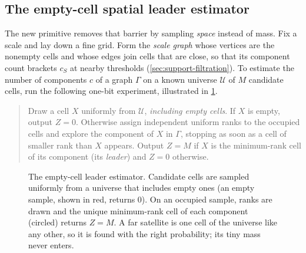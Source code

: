 \subsection{The empty-cell spatial leader estimator}\label{sec:ov-leader}

The new primitive removes that barrier by sampling \emph{space} instead of mass. Fix a scale and lay
down a fine grid. Form the \emph{scale graph} whose vertices are the nonempty cells and whose edges join
cells that are close, so that its component count brackets $c_S$ at nearby thresholds
(\cref{sec:support-filtration}). To estimate the number of components $c$ of a graph $\Gamma$ on a known
universe $\mathcal U$ of $M$ candidate cells, run the following one-bit experiment, illustrated in
\cref{fig:leader}.

\begin{quote}
Draw a cell $X$ uniformly from $\mathcal U$, \emph{including empty cells}. If $X$ is empty, output $Z=0$.
Otherwise assign independent uniform ranks to the occupied cells and explore the component of $X$ in
$\Gamma$, stopping as soon as a cell of smaller rank than $X$ appears. Output $Z=M$ if $X$ is the
minimum-rank cell of its component (its \emph{leader}) and $Z=0$ otherwise.
\end{quote}

\begin{figure}[t]
\centering
{}
\caption{The empty-cell leader estimator. Candidate cells are sampled uniformly from a universe that
includes empty ones (an empty sample, shown in red, returns $0$). On an occupied sample, ranks are drawn
and the unique minimum-rank cell of each component (circled) returns $Z=M$. A far satellite is one cell of
the universe like any other, so it is found with the right probability; its tiny mass never enters.}
\label{fig:leader}
\end{figure}

